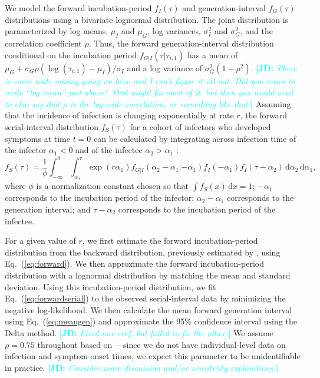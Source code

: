 \documentclass[12pt]{article}
\newcommand{\comment}{\showcomment}
\newcommand{\showcomment}[3]{\textcolor{#1}{\textbf{[#2: }\textsl{#3}\textbf{]}}}
\newcommand{\jd}[1]{\comment{cyan}{JD}{#1}}
\newcommand{\eref}[1]{Eq.~(\ref{eq:#1})}
\newcommand{\dd}[1]{\ensuremath{\, \mathrm{d}#1}}
\newcommand{\dx}{\dd{x}}
\begin{document}
We model the forward incubation-period $f_I(\tau)$ and generation-interval $f_G(\tau)$ distributions using a bivariate lognormal distribution.
The joint distribution is parameterized by log means, $\mu_I$ and $\mu_G$, log variances, $\sigma_I^2$ and $\sigma_G^2$, and the correlation coefficient $\rho$.
Thus, the forward generation-interval distribution conditional on the incubation period $f_{G|I}(\tau|\tau_{i,1})$ has a mean of $\mu_G + \sigma_G \rho (\log(\tau_{i, 1}) - \mu_I)/\sigma_I$ and a log variance of $\sigma_G^2 (1 - \rho^2)$.
\jd{There is some scale mixing going on here and I can't figure it all out. Did you mean to write ``log mean'' just above? That might fix most of it, but then you would need to also say that $\rho$ is the log-scale correlation, or something like that.}
Assuming that the incidence of infection is changing exponentially at rate $r$, the forward serial-interval distribution $f_S(\tau)$ for a cohort of infectors who developed symptoms at time $t = 0$ can be calculated by integrating across infection time of the infector $\alpha_1 < 0$ and of the infectee $\alpha_2 > \alpha_1$ \citep{park2021forward}:
\begin{equation}
f_S(\tau) = \frac{1}{\phi} \int_{-\infty}^0\int_{\alpha_1}^\tau \exp(r \alpha_1) f_{G|I}(\alpha_2 - \alpha_1|- \alpha_1) f_I(- \alpha_1) f_I(\tau - \alpha_2) \dd \alpha_2 \dd \alpha_1,
\label{eq:forwardserial}
\end{equation}
where $\phi$ is a normalization constant chosen so that $\int f_S(x) \dx = 1$;
$-\alpha_1$ corresponds to the incubation period of the infector;
$\alpha_2 - \alpha_1$ corresponds to the generation interval;
and $\tau - \alpha_2$ corresponds to the incubation period of the infectee.

For a given value of $r$, we first estimate the forward incubation-period distribution from the backward distribution, previously estimated by \cite{backer2021omicron}, using \eref{forward}.
We then approximate the forward incubation-period distribution with a lognormal distribution by matching the mean and standard deviation.
Using this incubation-period distribution, we fit \eref{forwardserial} to the observed serial-interval data by minimizing the negative log-likelihood.
We then calculate the mean forward generation interval using \eref{meangen} and approximate the 95\% confidence interval using the Delta method.
\jd{Fixed one eref, but failed to fix the other.}
We assume $\rho = 0.75$ throughout based on \cite{sender2021unmitigated}---since we do not have individual-level data on infection and symptom onset times, we expect this parameter to be unidentifiable in practice.
\jd{Consider more discussion and/or sensitivity explorations.}
\end{document}
